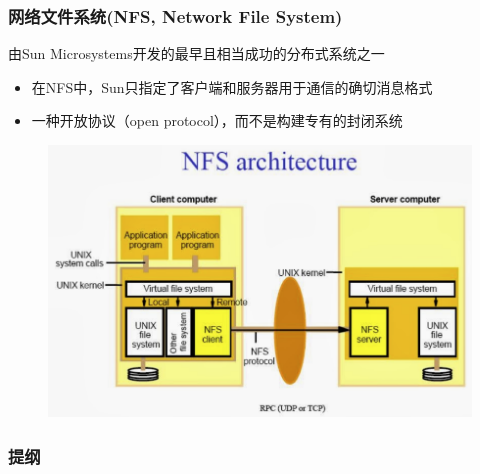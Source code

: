 \begin{frame}[fragile]
    \frametitle{网络文件系统(NFS, Network File System)}
    由Sun Microsystems开发的最早且相当成功的分布式系统之一
    \pause
    \begin{itemize}
        \item 在NFS中，Sun只指定了客户端和服务器用于通信的确切消息格式
        \item 一种开放协议（open protocol），而不是构建专有的封闭系统
    \end{itemize}

        \begin{figure}
            \includegraphics[width=0.5\linewidth]{figs/sun-nfs.png}
        \end{figure}
\end{frame}
\begin{frame}
    \frametitle{提纲} %
    \tableofcontents %
    
    
\end{frame}

